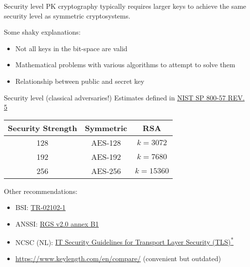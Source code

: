 \begin{frame}{Security level}
  PK cryptography typically requires larger keys to achieve the same security level as symmetric cryptosystems.

  \pause
  Some shaky explanations:
  \begin{itemize}[<+(1)->]
    \item Not all keys in the bit-space are valid
    \item Mathematical problems with various algorithms to attempt to solve them
    \item Relationship between public and secret key
  \end{itemize}
\end{frame}

\begin{frame}{Security level (classical adversaries!)}
  Estimates defined in \href{https://csrc.nist.gov/pubs/sp/800/57/pt1/r5/final}{NIST SP 800-57 REV. 5}

  \pause
  \begin{center}
  \begin{tabular}{@{}ccc@{}}
    Security Strength & Symmetric & RSA\\
    \toprule
    128 & AES-128 & $k = 3072$\\
    192 & AES-192 & $k = 7680$\\
    256 & AES-256 & $k = 15360$
  \end{tabular}
  \end{center}

  \pause
  Other recommendations:
  \begin{itemize}
    \item BSI: \href{https://www.bsi.bund.de/EN/Themen/Unternehmen-und-Organisationen/Standards-und-Zertifizierung/Technische-Richtlinien/TR-nach-Thema-sortiert/tr02102/tr02102_node.html}{TR-02102-1}
    \item ANSSI: \href{https://cyber.gouv.fr/le-referentiel-general-de-securite-version-20-les-documents}{RGS v2.0 annex B1}
    \item NCSC (NL): \href{https://english.ncsc.nl/publications/publications/2025/06/26/security-guidelines-for-transport-layer-security-2025-05}{IT Security Guidelines for
    Transport Layer Security (TLS)\textsuperscript{*}}
    \item {\scriptsize\url{https://www.keylength.com/en/compare/}} (convenient but outdated)
  \end{itemize}
\end{frame}

